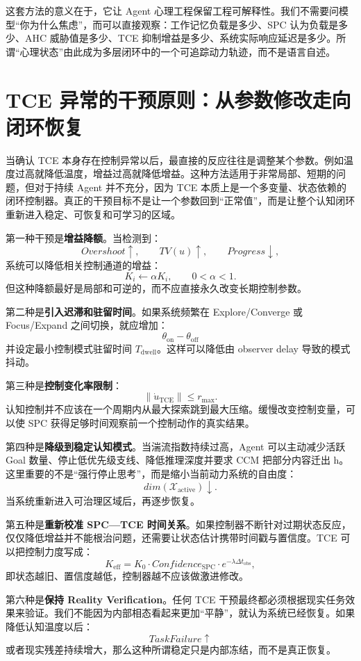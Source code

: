 这套方法的意义在于，它让 Agent 心理工程保留工程可解释性。我们不需要问模型“你为什么焦虑”，而可以直接观察：工作记忆负载是多少、SPC 认为负载是多少、AHC 威胁值是多少、TCE 抑制增益是多少、系统实际响应延迟是多少。所谓“心理状态”由此成为多层闭环中的一个可追踪动力轨迹，而不是语言自述。

\section{TCE 异常的干预原则：从参数修改走向闭环恢复}

当确认 TCE 本身存在控制异常以后，最直接的反应往往是调整某个参数。例如温度过高就降低温度，增益过高就降低增益。这种方法适用于非常局部、短期的问题，但对于持续 Agent 并不充分，因为 TCE 本质上是一个多变量、状态依赖的闭环控制器。真正的干预目标不是让一个参数回到“正常值”，而是让整个认知闭环重新进入稳定、可恢复和可学习的区域。

第一种干预是\textbf{增益降额}。当检测到：
\[
Overshoot\uparrow,
\qquad
TV(u)\uparrow,
\qquad
Progress\downarrow,
\]
系统可以降低相关控制通道的增益：
\[
K_i
\leftarrow
\alpha K_i,
\qquad
0<\alpha<1.
\]
但这种降额最好是局部和可逆的，而不应直接永久改变长期控制参数。

第二种是\textbf{引入迟滞和驻留时间}。如果系统频繁在 Explore/Converge 或 Focus/Expand 之间切换，就应增加：
\[
\theta_{\mathrm{on}}-\theta_{\mathrm{off}}
\]
并设定最小控制模式驻留时间 \(T_{\mathrm{dwell}}\)。这样可以降低由 observer delay 导致的模式抖动。

第三种是\textbf{控制变化率限制}：
\[
\|\dot u_{\mathrm{TCE}}\|
\leq
r_{\max}.
\]
认知控制并不应该在一个周期内从最大探索跳到最大压缩。缓慢改变控制变量，可以使 SPC 获得足够时间观察前一个控制动作的真实结果。

第四种是\textbf{降级到稳定认知模式}。当湍流指数持续过高，Agent 可以主动减少活跃 Goal 数量、停止低优先级支线、降低推理深度并要求 CCM 把部分内容迁出 h。这里重要的不是“强行停止思考”，而是缩小当前动力系统的自由度：
\[
dim(\mathcal X_{\mathrm{active}})
\downarrow.
\]
当系统重新进入可治理区域后，再逐步恢复。

第五种是\textbf{重新校准 SPC—TCE 时间关系}。如果控制器不断针对过期状态反应，仅仅降低增益并不能根治问题，还需要让状态估计携带时间戳与置信度。TCE 可以把控制力度写成：
\[
K_{\mathrm{eff}}
=
K_0
\cdot
Confidence_{\mathrm{SPC}}
\cdot
e^{-\lambda \Delta t_{\mathrm{obs}}},
\]
即状态越旧、置信度越低，控制器越不应该做激进修改。

第六种是\textbf{保持 Reality Verification}。任何 TCE 干预最终都必须根据现实任务效果来验证。我们不能因为内部相态看起来更加“平静”，就认为系统已经恢复。如果降低认知温度以后：
\[
TaskFailure\uparrow
\]
或者现实残差持续增大，那么这种所谓稳定只是内部冻结，而不是真正恢复。

